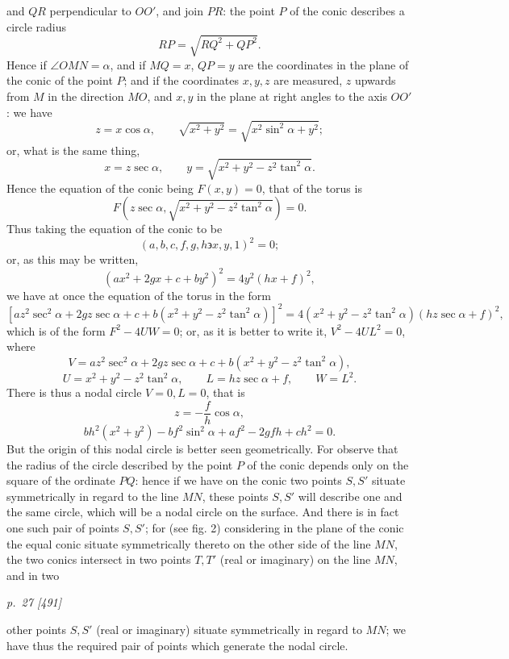 ﻿\documentclass[11pt,a4paper]{article}
\theoremstyle{plain}
\theoremstyle{definition}
\newcommand{\eps}{\backepsilon}
\begin{document}
and \(QR\) perpendicular to \(OO'\), and join \(PR\): the point \(P\) of the
conic describes a circle radius
\[
RP=\sqrt{RQ^2+QP^2}.
\]
Hence if \(\angle OMN=\alpha\), and if \(MQ=x\), \(QP=y\) are the
coordinates in the plane of the conic of the point \(P\); and if the
coordinates \(x,y,z\) are measured, \(z\) upwards from \(M\) in the
direction \(MO\), and \(x,y\) in the plane at right angles to the axis
\(OO'\): we have
\[
z=x\cos\alpha,\qquad
\sqrt{x^2+y^2}=\sqrt{x^2\sin^2\alpha+y^2};
\]
or, what is the same thing,
\[
x=z\sec\alpha,\qquad
y=\sqrt{x^2+y^2-z^2\tan^2\alpha}.
\]
Hence the equation of the conic being \(F(x,y)=0\), that of the torus is
\[
F\left(z\sec\alpha,\sqrt{x^2+y^2-z^2\tan^2\alpha}\right)=0.
\]
Thus taking the equation of the conic to be
\[
(a,b,c,f,g,h\eps x,y,1)^2=0;
\]
or, as this may be written,
\[
(ax^2+2gx+c+by^2)^2=4y^2(hx+f)^2,
\]
we have at once the equation of the torus in the form
\[
\left[az^2\sec^2\alpha+2gz\sec\alpha+c
+b(x^2+y^2-z^2\tan^2\alpha)\right]^2
=4(x^2+y^2-z^2\tan^2\alpha)(hz\sec\alpha+f)^2,
\]
which is of the form \(F^2-4UW=0\); or, as it is better to write it,
\(V^2-4UL^2=0\), where
\[
V=az^2\sec^2\alpha+2gz\sec\alpha+c
+b(x^2+y^2-z^2\tan^2\alpha),
\]
\[
U=x^2+y^2-z^2\tan^2\alpha,\qquad
L=hz\sec\alpha+f,\qquad W=L^2.
\]
There is thus a nodal circle \(V=0,L=0\), that is
\[
z=-\frac{f}{h}\cos\alpha,
\]
\[
bh^2(x^2+y^2)-bf^2\sin^2\alpha+af^2-2gfh+ch^2=0.
\]
But the origin of this nodal circle is better seen geometrically. For
observe that the radius of the circle described by the point \(P\) of the
conic depends only on the square of the ordinate \(PQ\): hence if we have
on the conic two points \(S,S'\) situate symmetrically in regard to the
line \(MN\), these points \(S,S'\) will describe one and the same circle,
which will be a nodal circle on the surface. And there is in fact one such
pair of points \(S,S'\); for (see fig. 2) considering in the plane of the
conic the equal conic situate symmetrically thereto on the other side of
the line \(MN\), the two conics intersect in two points \(T,T'\) (real or
imaginary) on the line \(MN\), and in two


\textit{p.~27 [491]}

other points \(S,S'\) (real or imaginary) situate symmetrically in regard to
\(MN\); we have thus the required pair of points which generate the nodal
circle.
\end{document}
